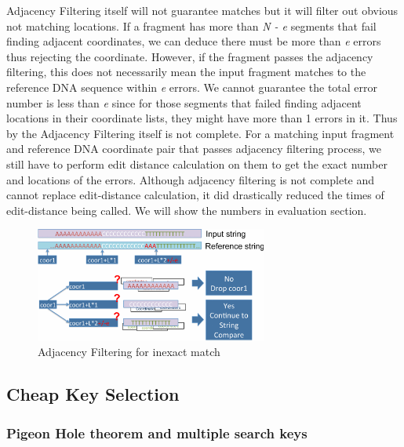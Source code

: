 Adjacency Filtering itself will not guarantee matches but it will filter out
obvious not matching locations. If a fragment has more than \textit{N - e}
segments that fail finding adjacent coordinates, we can deduce there must be
more than \textit{e} errors thus rejecting the coordinate. However, if the
fragment passes the adjacency filtering, this does not necessarily mean the
input fragment matches to the reference DNA sequence within \textit{e} errors.
We cannot guarantee the total error number is less than \textit{e} since for
those segments that failed finding adjacent locations in their coordinate
lists, they might have more than 1 errors in it. Thus by the Adjacency
Filtering itself is not complete. For a matching input fragment and reference
DNA coordinate pair that passes adjacency filtering process, we still have to
perform edit distance calculation on them to get the exact number and locations
of the errors. Although adjacency filtering is not complete and cannot replace
edit-distance calculation, it did drastically reduced the times of
edit-distance being called. We will show the numbers in evaluation section.\\

\begin{figure}[t] 
\centering
\vspace{0.1in}
\includegraphics[width=3in]{./figure/AD_2_B.pdf} \vspace{0in}
\caption{Adjacency Filtering for inexact match}
\label{fig:ad_2} 
\end{figure}

\subsection{Cheap Key Selection} \label{sec:cheapkey}

\subsubsection{Pigeon Hole theorem and multiple search keys} 

